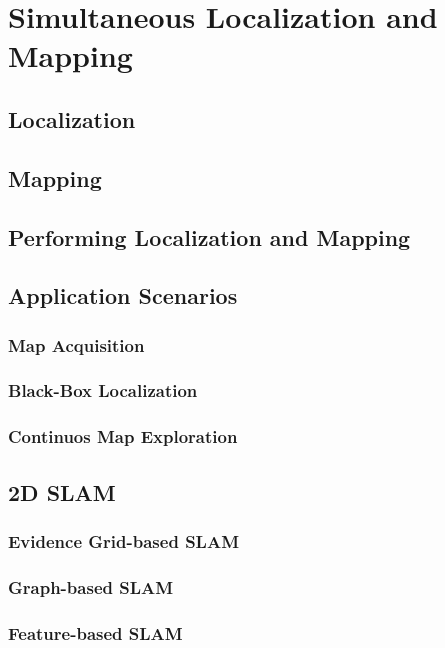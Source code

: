 \chapter{Simultaneous Localization and Mapping}
\label{chapter:slam}

\section{Localization}


\section{Mapping}


\section{Performing Localization and Mapping}


\section{Application Scenarios}

\subsection{Map Acquisition}

\subsection{Black-Box Localization}

\subsection{Continuos Map Exploration}


\section{2D SLAM}

\subsection{Evidence Grid-based SLAM}

\subsection{Graph-based SLAM}

\subsection{Feature-based SLAM}


